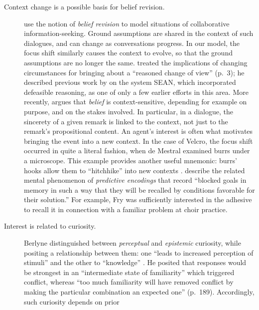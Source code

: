  \begin{description}                      
 \item[Context change is a possible basis for belief revision.]
   \citet{logan1994modelling} use the notion of \emph{belief revision}
   to model situations of collaborative information-seeking.  Ground
   assumptions are shared in the context of such dialogues, and can
   change as conversations progress.  In our model, the focus shift
   similarly causes the context to evolve, so that the ground
   assumptions are no longer
   the same.  \citet{harman1986change} treated the implications of
   changing circumstances for bringing about a ``reasoned change of
   view'' (p.~3); he described previous work by
   \citet{Doyle:1980:MDA:889488} on the system {\sf SEAN}, which
   incorporated defeasible reasoning, as one of only a few earlier
   efforts in this area.  More recently, \citet{clarke2017assertion}
   argues that \emph{belief} is context-sensitive, depending for
   example on purpose, and on the stakes involved.  In particular, in a
   dialogue, the sincerety of a given remark is linked to the context,
   not just to the remark's propositional content.  An agent's
   interest is often what motivates bringing the event into a new context.
   In the case of Velcro\textsuperscript{\texttrademark}, the focus
   shift occurred in quite a literal fashion, when de Mestral examined
   burrs under a microscope.  This example provides another useful
   mnemonic: burrs' hooks allow them to ``hitchhike'' into new contexts
   \cite[]{jenkins2011bio}.
   \citet{patalano1993predictive} describe the related mental
   phenomenon of \emph{predictive encodings} that record ``blocked
   goals in memory in such a way that they will be recalled by
   conditions favorable for their solution.''
      For example, Fry was sufficiently interested in the adhesive to
    recall it in connection with a familiar problem at choir
    practice.
 \item[Interest is related to curiosity.]  Berlyne distinguished
   between \emph{perceptual} and \emph{epistemic} curiosity, while
   positing a relationship between them: one ``leads to increased
   perception of stimuli'' and the other to ``knowledge''
   \cite[p.~180]{berlyne1954theory}.  He posited that responses would
   be strongest in an ``intermediate state of familiarity'' which
   triggered conflict, whereas ``too much familiarity will have removed
   conflict by making the particular combination an expected one''
   (p.~189).  Accordingly, such curiosity depends on prior

\end{description}
